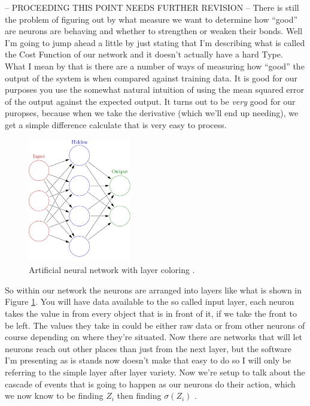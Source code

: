 \documentclass[a4paper,10pt]{article}
\begin{document}
\bigskip

-- PROCEEDING THIS POINT NEEDS FURTHER REVISION --
There is still the problem of figuring out by what
measure we want to determine how ``good'' are neurons are behaving and whether to strengthen or weaken their bonds. 
Well I'm going to jump ahead a little by just stating that I'm describing what is called the Cost Function of our
network and it doesn't actually have a hard Type.  What I mean by that is there are a number of ways of measuring how
``good'' the output of the system is when compared against training data. It is good for our purposes you use the
somewhat natural intuition of using the mean squared error of the output against the expected output.  It turns out to
be \textit{very} good for our puropses, because when we take the derivative (which we'll end up needing), we get a
simple difference calculate that is very easy to process.  

\begin{figure}[H] 
\centering
	\includegraphics[width=0.4\textwidth]{images/network.png}
	\caption{Artificial neural network with layer coloring \protect\cite{NetImg}. \protect\footnotemark}
	\label{fig:NetImg}
\end{figure} 


So within our network the neurons are arranged into layers like what is shown in Figure \ref{fig:NetImg}.  You will
have data available to the so called input layer, each neuron takes the value in from every object that is in
front of it, if we take the front to be left. The values they take in could be either raw data or from other neurons of
course depending on where they're situated.  Now there are networks that will let neurons reach out other places
than just from the next layer, but the software I'm presenting as is stands now doesn't make that easy to do so I will
only be referring to the simple layer after layer variety.  Now we're setup to talk about the
cascade of events that is going to happen as our neurons do their action, which we now know to be finding $Z_i$ then
finding $\sigma(Z_i)$ .
\end{document}
